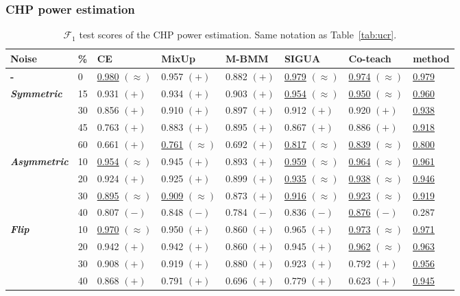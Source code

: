 \documentclass[runningheads, envcountsame, a4paper]{llncs}
\newcommand{\F}{\ensuremath{\mathcal{F}}}
\begin{document}
\subsubsection{CHP power estimation}
\begin{table*}[tbh]
    \centering
    \scriptsize
    \setlength{\tabcolsep}{3pt}
    \caption{ $\F_1$ test scores of the CHP power estimation. Same notation as Table~\ref{tab:ucr}.}
    \label{tab:CHP_results}
    \begin{tabular*}{\textwidth}{ l l @{\extracolsep{\fill}}  l l l l l l}
    \toprule
    \textbf{Noise}&\textbf{\%}&\textbf{CE}&\textbf{MixUp}&\textbf{M-BMM}&\textbf{SIGUA}&\textbf{Co-teach}&\textbf{\acrshort{method}}\\
    \midrule
    \textbf{-} & 0 & \underline{0.980} $(\approx)$ & 0.957 $(+)$ & 0.882 $(+)$ & \underline{0.979} $(\approx)$ & \underline{0.974} $(\approx)$ & \underline{0.979} \\
    \midrule
    \multirow{4}{*}{\textbf{\textit{Symmetric}}} & 15 & 0.931 $(+)$ & 0.934 $(+)$ & 0.903 $(+)$ & \underline{0.954} $(\approx)$ & \underline{0.950} $(\approx)$ & \underline{0.960}\\
    & 30 & 0.856 $(+)$ & 0.910 $(+)$ & 0.897 $(+)$ & 0.912 $(+)$ & 0.920 $(+)$ & \underline{0.938}\\
    & 45 & 0.763 $(+)$ & 0.883 $(+)$ & 0.895 $(+)$ & 0.867 $(+)$ & 0.886 $(+)$ & \underline{0.918}\\
    & 60 & 0.661 $(+)$ & \underline{0.761} $(\approx)$ & 0.692 $(+)$ & \underline{0.817} $(\approx)$ & \underline{0.839} $(\approx)$ & \underline{0.800}\\
    \midrule
    \multirow{4}{*}{\textbf{\textit{Asymmetric}}} & 10 & \underline{0.954} $(\approx)$ & 0.945 $(+)$ & 0.893 $(+)$ & \underline{0.959} $(\approx)$ & \underline{0.964} $(\approx)$ & \underline{0.961}\\
    & 20 & 0.924 $(+)$ & 0.925 $(+)$ & 0.899 $(+)$ & \underline{0.935} $(\approx)$ & \underline{0.938} $(\approx)$ & \underline{0.946}\\
    & 30 & \underline{0.895} $(\approx)$ & \underline{0.909} $(\approx)$ & 0.873 $(+)$ & \underline{0.916} $(\approx)$ & \underline{0.923} $(\approx)$ & \underline{0.919}\\
    & 40 & 0.807 $(-)$ & 0.848 $(-)$ & 0.784 $(-)$ & 0.836 $(-)$ & \underline{0.876} $(-)$ & 0.287\\
    \midrule
    \multirow{4}{*}{\textbf{\textit{Flip}}} & 10 & \underline{0.970} $(\approx)$ & 0.950 $(+)$ & 0.860 $(+)$ & 0.965 $(+)$ & \underline{0.973} $(\approx)$ & \underline{0.971}\\
    & 20 & 0.942 $(+)$ & 0.942 $(+)$ & 0.860 $(+)$ & 0.945 $(+)$ & \underline{0.962} $(\approx)$ & \underline{0.963}\\
    & 30 & 0.908 $(+)$ & 0.919 $(+)$ & 0.880 $(+)$ & 0.923 $(+)$ & 0.792 $(+)$ & \underline{0.956}\\
    & 40 & 0.868 $(+)$ & 0.791 $(+)$ & 0.696 $(+)$ & 0.779 $(+)$ & 0.623 $(+)$ & \underline{0.945}\\
    \bottomrule
    \end{tabular*}
\end{table*}
\end{document}

